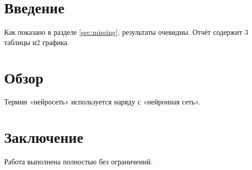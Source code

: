 \chapter{Введение}
Как показано в разделе \ref{sec:missing}, результаты очевидны.
Отчёт содержит 3 таблицы и2 графика.
\chapter{Обзор}
Термин «нейросеть» используется наряду с «нейронная сеть».
\chapter{Заключение}
Работа выполнена полностью без ограничений.
